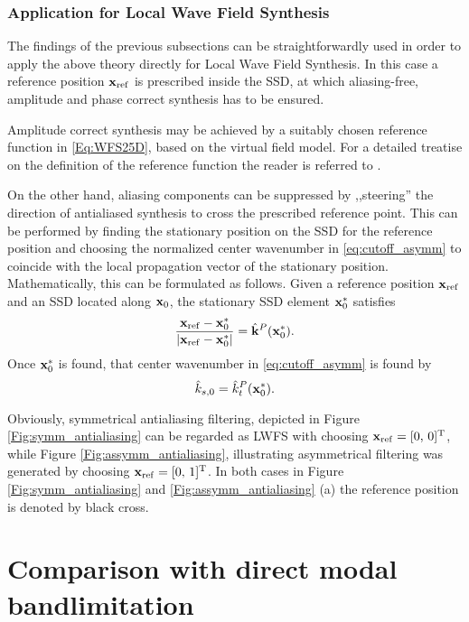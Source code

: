 \documentclass[conference]{IEEEtran}
\begin{document}
\subsubsection{Application for Local Wave Field Synthesis}
The findings of the previous subsections can be straightforwardly used in order to apply the above theory directly for Local Wave Field Synthesis.
In this case a reference position $\mathbf{x}_{\mathrm{ref}}$ is prescribed inside the SSD, at which aliasing-free, amplitude and phase correct synthesis has to be ensured.

Amplitude correct synthesis may be achieved by a suitably chosen reference function in \eqref{Eq:WFS25D}, based on the virtual field model.
For a detailed treatise on the definition of the reference function the reader is referred to \cite{Firtha2019phd}.

On the other hand, aliasing components can be suppressed by ,,steering'' the direction of antialiased synthesis to cross the prescribed reference point.
This can be performed by finding the stationary position on the SSD for the reference position and choosing the normalized center wavenumber in \eqref{eq:cutoff_asymm} to coincide with the local propagation vector of the stationary position.
Mathematically, this can be formulated as follows.
Given a reference position $\mathbf{x}_{\mathrm{ref}}$ and an SSD located along $\mathbf{x}_0$, the stationary SSD element $\mathbf{x}_0^*$ satisfies
\begin{equation}
    \frac{\mathbf{x}_{\mathrm{ref}} - \mathbf{x}_0^*}{\left| \mathbf{x}_{\mathrm{ref}} - \mathbf{x}_0^* \right|} = \hat{\mathbf{k}}^P(\mathbf{x}_0^*).
\end{equation}
Once $\mathbf{x}_0^*$ is found, that center wavenumber in \eqref{eq:cutoff_asymm} is found by
\begin{equation}
    \hat{k}_{s,0} = \hat{k}_t^P(\mathbf{x}_0^*).
\end{equation}

Obviously, symmetrical antialiasing filtering, depicted in Figure \ref{Fig:symm_antialiasing} can be regarded as LWFS with choosing $\mathbf{x}_{\mathrm{ref}} = [0, \, 0]^{\mathrm{T}}$,
while Figure \ref{Fig:assymm_antialiasing}, illustrating asymmetrical filtering was generated by choosing $\mathbf{x}_{\mathrm{ref}} = [0, \, 1]^{\mathrm{T}}$.
In both cases in Figure \ref{Fig:symm_antialiasing} and \ref{Fig:assymm_antialiasing} (a) the reference position is denoted by black cross.

\section{Comparison with direct modal bandlimitation}
\end{document}
